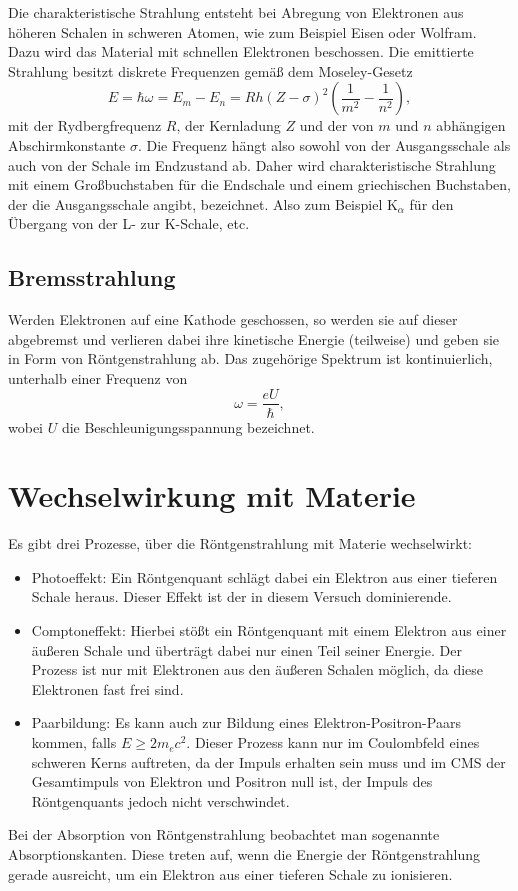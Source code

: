 Die charakteristische Strahlung entsteht bei Abregung von Elektronen aus höheren Schalen in schweren Atomen, wie zum Beispiel Eisen oder Wolfram. Dazu wird das Material mit schnellen Elektronen beschossen.
Die emittierte Strahlung besitzt diskrete Frequenzen gemäß dem Moseley-Gesetz \cite{litmap}
\begin{equation}
 E = \hbar\omega = E_{m}-E_{n} = Rh\left(Z-\sigma\right)^{2}\left(\frac{1}{m^{2}}-\frac{1}{n^{2}}\right),
\end{equation}
mit der Rydbergfrequenz $R$, der Kernladung $Z$ und der von $m$ und $n$ abhängigen Abschirmkonstante $\sigma$.
Die Frequenz hängt also sowohl von der Ausgangsschale als auch von der Schale im Endzustand ab. Daher wird charakteristische Strahlung mit einem Großbuchstaben für die Endschale und einem griechischen Buchstaben, der die Ausgangsschale angibt, bezeichnet.
Also zum Beispiel K$_{\alpha}$ für den Übergang von der L- zur K-Schale, etc.

\subsection{Bremsstrahlung}

Werden Elektronen auf eine Kathode geschossen, so werden sie auf dieser abgebremst und verlieren dabei ihre kinetische Energie (teilweise) und geben sie in Form von Röntgenstrahlung ab.
Das zugehörige Spektrum ist kontinuierlich, unterhalb einer Frequenz von
\begin{equation}
 \omega = \frac{eU}{\hbar},
\end{equation}
wobei $U$ die Beschleunigungsspannung bezeichnet.

\section{Wechselwirkung mit Materie}

Es gibt drei Prozesse, über die Röntgenstrahlung mit Materie wechselwirkt: \cite{Dem16}
\begin{itemize}
 \item Photoeffekt: Ein Röntgenquant schlägt dabei ein Elektron aus einer tieferen Schale heraus. Dieser Effekt ist der in diesem Versuch dominierende.
 \item Comptoneffekt: Hierbei stößt ein Röntgenquant mit einem Elektron aus einer äußeren Schale und überträgt dabei nur einen Teil seiner Energie. Der Prozess ist nur mit Elektronen aus den äußeren Schalen möglich, da diese Elektronen fast frei sind. 
 \item Paarbildung: Es kann auch zur Bildung eines Elektron-Positron-Paars kommen, falls $E\geq 2m_{e}c^{2}$. Dieser Prozess kann nur im Coulombfeld eines schweren Kerns auftreten, da der Impuls erhalten sein muss und im CMS der Gesamtimpuls von Elektron und Positron null ist, der Impuls des Röntgenquants jedoch nicht verschwindet.
\end{itemize}
Bei der Absorption von Röntgenstrahlung beobachtet man sogenannte Absorptionskanten. Diese treten auf, wenn die Energie der Röntgenstrahlung gerade ausreicht, um ein Elektron aus einer tieferen Schale zu ionisieren.

